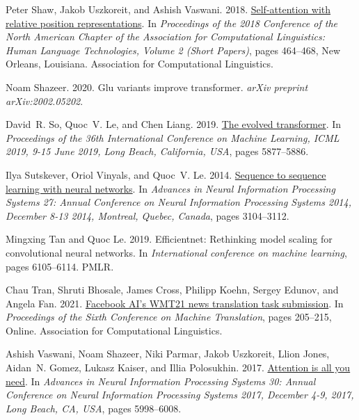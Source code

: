 \documentclass[11pt]{article}
\begin{document}
\begin{thebibliography}{49}
Peter Shaw, Jakob Uszkoreit, and Ashish Vaswani. 2018.
\newblock \href {https://doi.org/10.18653/v1/N18-2074} {Self-attention with relative position representations}.
\newblock In \emph{Proceedings of the 2018 Conference of the North {A}merican Chapter of the Association for Computational Linguistics: Human Language Technologies, Volume 2 (Short Papers)}, pages 464--468, New Orleans, Louisiana. Association for Computational Linguistics.

Noam Shazeer. 2020.
\newblock Glu variants improve transformer.
\newblock \emph{arXiv preprint arXiv:2002.05202}.

David~R. So, Quoc~V. Le, and Chen Liang. 2019.
\newblock \href {http://proceedings.mlr.press/v97/so19a.html} {The evolved transformer}.
\newblock In \emph{Proceedings of the 36th International Conference on Machine Learning, {ICML} 2019, 9-15 June 2019, Long Beach, California, {USA}}, pages 5877--5886.

Ilya Sutskever, Oriol Vinyals, and Quoc~V. Le. 2014.
\newblock \href {https://proceedings.neurips.cc/paper/2014/hash/a14ac55a4f27472c5d894ec1c3c743d2-Abstract.html} {Sequence to sequence learning with neural networks}.
\newblock In \emph{Advances in Neural Information Processing Systems 27: Annual Conference on Neural Information Processing Systems 2014, December 8-13 2014, Montreal, Quebec, Canada}, pages 3104--3112.

Mingxing Tan and Quoc Le. 2019.
\newblock Efficientnet: Rethinking model scaling for convolutional neural networks.
\newblock In \emph{International conference on machine learning}, pages 6105--6114. PMLR.

Chau Tran, Shruti Bhosale, James Cross, Philipp Koehn, Sergey Edunov, and Angela Fan. 2021.
\newblock \href {https://aclanthology.org/2021.wmt-1.19} {{F}acebook {AI}{'}s {WMT}21 news translation task submission}.
\newblock In \emph{Proceedings of the Sixth Conference on Machine Translation}, pages 205--215, Online. Association for Computational Linguistics.

Ashish Vaswani, Noam Shazeer, Niki Parmar, Jakob Uszkoreit, Llion Jones, Aidan~N. Gomez, Lukasz Kaiser, and Illia Polosukhin. 2017.
\newblock \href {https://proceedings.neurips.cc/paper/2017/hash/3f5ee243547dee91fbd053c1c4a845aa-Abstract.html} {Attention is all you need}.
\newblock In \emph{Advances in Neural Information Processing Systems 30: Annual Conference on Neural Information Processing Systems 2017, December 4-9, 2017, Long Beach, CA, {USA}}, pages 5998--6008.


\end{thebibliography}
\end{document}
